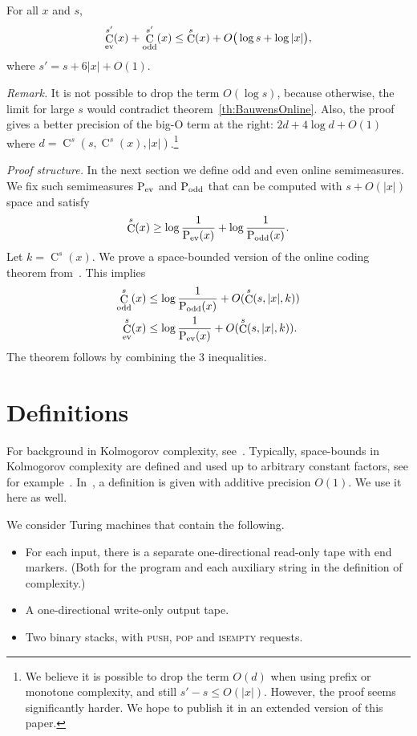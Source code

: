 \documentclass[runningheads]{llncs}
\DeclareMathOperator{\C}{C} \newcommand{\Cev}{\C_\textnormal{ev}} \newcommand{\Codd}{\C_\textnormal{odd}}
\DeclareMathOperator{\Pev}{P_{\textnormal{ev}}} \DeclareMathOperator{\Podd}{P_{\textnormal{odd}}} \DeclareMathOperator{\Pc}{PC}
\begin{document}
\begin{theorem}\label{th:main}
  For all $x$ and $s$, 
  \[
    \Cev^{s'}(x) + \Codd^{s'}(x) \le \C^s(x) + O\big(\log s + \log |x|\big),
  \]
  where $s' = s + 6|x| + O(1)$.
\end{theorem}

\noindent
{\em Remark.} It is not possible to drop the term $O(\log s)$, 
because otherwise, the limit for large $s$ would contradict theorem~\ref{th:BauwensOnline}.
Also, the proof gives a better precision of the big-O term at the right: $2d + 4\log d + O(1)$ where $d = \C^s(s,\C^s(x),|x|)$.\footnote{
  We believe it is possible to drop the term $O(d)$ when using prefix or monotone complexity, and still 
  $s'-s \le O(|x|)$.  However, the proof seems significantly harder. 
  We hope to publish it in an extended version of this paper. 
}


\bigskip
\noindent
{\em Proof structure.} In the next section we define odd and even online semimeasures. 
We fix such semimeasures $\Pev$ and $\Podd$ that can be computed with $s + O(|x|)$ space and satisfy 
\begin{align*}
  \C^s(x) \ge \log \frac 1 {\Pev(x)} + \log \frac 1 {\Podd(x)}. 
\end{align*}
Let $k = \C^s(x)$. 
We prove a space-bounded version of the online coding theorem from~\cite{onlineComplexity}. This implies
\begin{align*}
  \Codd^s(x) &\le \log \frac 1 {\Podd(x)} + O(\C^s(s,|x|,k)) \\
  \Cev^s(x) &\le \log \frac 1 {\Pev(x)} + O(\C^s(s,|x|,k)). 
\end{align*}
The theorem follows by combining the 3 inequalities. 



\section{Definitions}\label{sec:def}


For background in Kolmogorov complexity, see~\cite{LiVitanyiForthEdition,bookShenVereshchagin}. 
Typically, space-bounds in Kolmogorov complexity are defined and used up to arbitrary constant factors, 
see for example~\cite{Hartmanis1983generalizedKolm,Longpre1986PhD,Longpre1993symmetry}. 
In~\cite{Bauwens2022Inequalities}, a definition is given with additive precision $O(1)$. We use it here as well. 

We consider Turing machines that contain the following. 
\begin{itemize}
  \item For each input, there is a separate one-directional read-only tape with end markers. (Both for the program and each auxiliary string in the definition of complexity.)
  \item A one-directional write-only output tape. 
  \item Two binary stacks, with \textsc{push}, \textsc{pop} and \textsc{isempty} requests.
\end{itemize}
\end{document}
